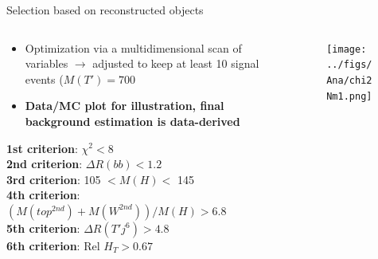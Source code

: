 \begin{frame}{Selection based on reconstructed objects}
\vspace{-.2cm}
\scriptsize

\begin{columns}
\begin{column}{.50\textwidth}
\vspace{-.2cm}
\begin{block}{}
\tiny
\begin{itemize}
\item Optimization via a multidimensional scan of variables $\to$ adjusted to keep at least 10 signal events ($M(T')=700$~\GeVcc
\item \textbf{Data/MC plot for illustration, final background estimation is data-derived}
\end{itemize}
\end{block}
\vspace{-.2cm}
\begin{block}{}\scriptsize
\textbf{1st criterion}: $\chi^{2}<8$\\
\textbf{2nd criterion}: $\Delta R(bb)<1.2$\\
\textbf{3rd criterion}: 105 $<M(H)<$ 145 \GeVcc\\
\textbf{4th criterion}: $(M(top^{2nd})+M(W^{2nd}))/M(H)>6.8$\\
\textbf{5th criterion}: $\Delta R (T' j^{6})>4.8$\\
\textbf{6th criterion}: Rel $H_{T}>0.67$
\end{block}
\end{column}

\begin{column}{.50\textwidth}
\begin{figure}[!Hhtbp]
  \begin{center}
    \texttt{[image: ../figs/Ana/chi2Nm1.png]}
  \end{center}
\end{figure}
\end{column}

\end{columns}

\end{frame}




